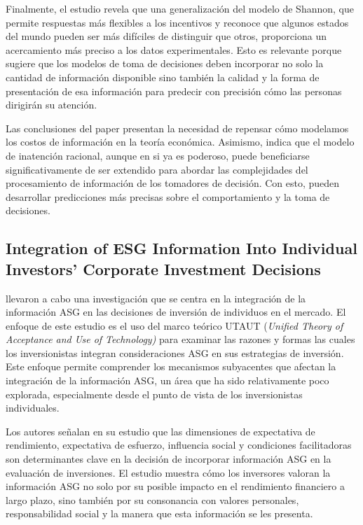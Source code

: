 Finalmente, el estudio revela que una generalización del modelo de Shannon, que permite respuestas más flexibles a los incentivos y reconoce que algunos estados del mundo pueden ser más difíciles de distinguir que otros, proporciona un acercamiento más preciso a los datos experimentales. Esto es relevante porque sugiere que los modelos de toma de decisiones deben incorporar no solo la cantidad de información disponible sino también la calidad y la forma de presentación de esa información para predecir con precisión cómo las personas dirigirán su atención.

Las conclusiones del paper presentan la necesidad de repensar cómo modelamos los costos de información en la teoría económica. Asimismo, indica que el modelo de inatención racional, aunque en si ya es poderoso, puede beneficiarse significativamente de ser extendido para abordar las complejidades del procesamiento de información de los tomadores de decisión. Con esto, pueden desarrollar predicciones más precisas sobre el comportamiento y la toma de decisiones.


\subsection{Integration of ESG Information Into Individual Investors' Corporate Investment Decisions}
 llevaron a cabo una investigación que se centra en la integración de la información ASG en las decisiones de inversión de individuos en el mercado. El enfoque de este estudio es el uso del marco teórico UTAUT (\textit{Unified Theory of Acceptance and Use of Technology)} para examinar las razones y formas las cuales los inversionistas integran consideraciones ASG en sus estrategias de inversión. Este enfoque permite comprender los mecanismos subyacentes que afectan la integración de la información ASG, un área que ha sido relativamente poco explorada, especialmente desde el punto de vista de los inversionistas individuales.

Los autores señalan en su estudio que las dimensiones de expectativa de rendimiento, expectativa de esfuerzo, influencia social y condiciones facilitadoras son determinantes clave en la decisión de incorporar información ASG en la evaluación de inversiones. El estudio muestra cómo los inversores valoran la información ASG no solo por su posible impacto en el rendimiento financiero a largo plazo, sino también por su consonancia con valores personales, responsabilidad social y la manera que esta información se les presenta.

